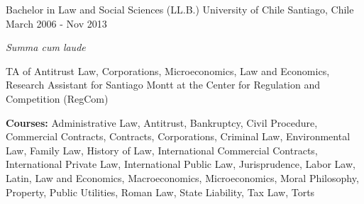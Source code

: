 \begin{cventries}
    \cventry
    {Bachelor in Law and Social Sciences (LL.B.)} %
    {University of Chile} %
    {Santiago, Chile} %
    {March 2006 - Nov 2013} %
    {
      \begin{cvitems} %
        \item {\textit{Summa cum laude}
        \item {TA of Antitrust Law, Corporations, Microeconomics, Law and Economics, Research Assistant for Santiago Montt at the Center for Regulation and Competition (RegCom)}
        \item {\textbf{Courses:} Administrative Law, Antitrust, Bankruptcy, Civil Procedure, Commercial Contracts, Contracts, Corporations, Criminal Law, Environmental Law, Family Law, History of Law, International Commercial Contracts, International Private Law, International Public Law, Jurisprudence, Labor Law, Latin, Law and Economics, Macroeconomics, Microeconomics, Moral Philosophy, Property, Public Utilities, Roman Law, State Liability, Tax Law, Torts}
       }
        \end{cvitems}
    }
\end{cventries}
